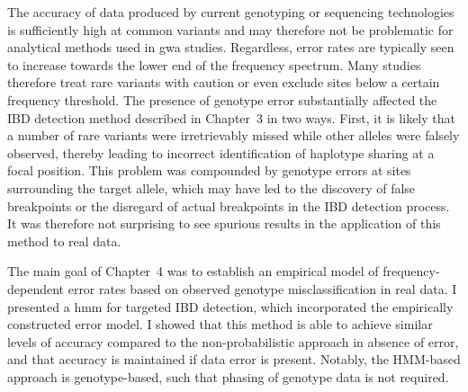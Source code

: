 
The accuracy of data produced by current genotyping or sequencing technologies is sufficiently high at common variants and may therefore not be problematic for analytical methods used in \gls{gwa} studies.
Regardless, error rates are typically seen to increase towards the lower end of the frequency spectrum.
Many studies therefore treat rare variants with caution or even exclude sites below a certain frequency threshold.
The presence of genotype error substantially affected the IBD detection method described in Chapter~3 in two ways.
First, it is likely that a number of rare variants were irretrievably missed while other alleles were falsely observed, thereby leading to incorrect identification of haplotype sharing at a focal position.
This problem was compounded by genotype errors at sites surrounding the target allele, which may have led to the discovery of false breakpoints or the disregard of actual breakpoints in the IBD detection process.
It was therefore not surprising to see spurious results in the application of this method to real data.

The main goal of Chapter~4 was to establish an empirical model of frequency-dependent error rates based on observed genotype misclassification in real data.
I presented a  \gls{hmm} for targeted IBD detection, which incorporated the empirically constructed error model.
I showed that this method is able to achieve similar levels of accuracy compared to the non-probabilistic approach in absence of error, and that accuracy is maintained if data error is present.
Notably, the HMM-based approach is genotype-based, such that phasing of genotype data is not required.

